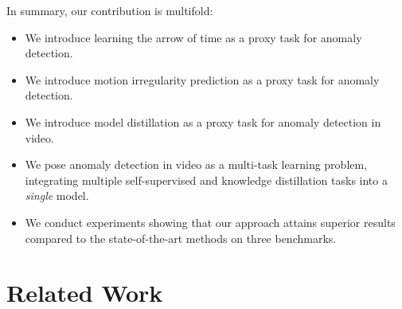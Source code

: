\documentclass[final]{cvpr}
\begin{document}
In summary, our contribution is multifold:
\begin{itemize}
\vspace{-0.25cm}
    \item We introduce learning the arrow of time as a proxy task for anomaly detection.
\vspace{-0.3cm}
    \item We introduce motion irregularity prediction as a proxy task for anomaly detection.
\vspace{-0.3cm}
    \item We introduce model distillation as a proxy task for anomaly detection in video.
\vspace{-0.3cm}
    \item We pose anomaly detection in video as a multi-task learning problem, integrating multiple self-supervised and knowledge distillation tasks into a \emph{single} model.
\vspace{-0.3cm}
    \item We conduct experiments showing that our approach attains superior results compared to the state-of-the-art methods on three benchmarks.
\vspace{-0.3cm}
\end{itemize}



\section{Related Work}
\label{sec_related}
\vspace{-0.1cm}
\end{document}
